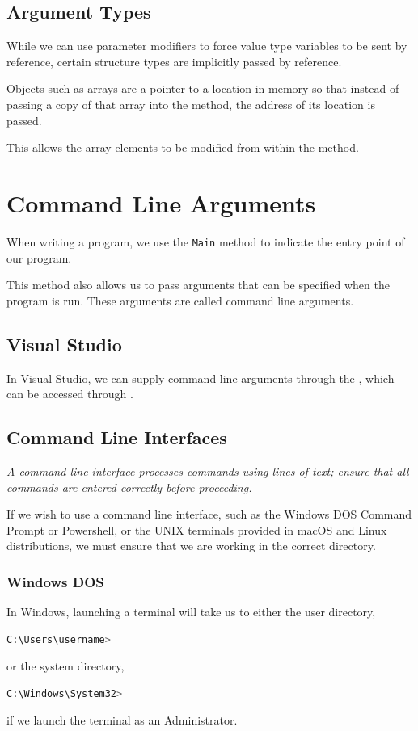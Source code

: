 \documentclass{article}
\begin{document}
\subsection{Argument Types}
While we can use parameter modifiers to force value type variables to be
sent by reference, certain structure types are implicitly passed by reference.

Objects such as arrays are a pointer to a location in memory so that
instead of passing a copy of that array into the method,
the address of its location is passed.

This allows the array elements to be modified from within
the method.
\section{Command Line Arguments}
When writing a program, we use the \lstinline{Main}
method to indicate the entry point of our program.

This method also allows us to pass arguments that can be
specified when the program is run. These arguments are called
command line arguments.
\subsection{Visual Studio}
In Visual Studio, we can supply command line arguments
through the , which can be accessed through
.
\subsection{Command Line Interfaces}
\emph{A command line interface processes commands using lines of text;
    ensure that all commands are entered correctly before proceeding.}

\vspace*{0.3cm}
If we wish to use a command line interface, such as the Windows DOS Command Prompt
or Powershell, or the UNIX terminals provided in macOS and Linux distributions,
we must ensure that we are working in the correct directory.
\subsubsection{Windows DOS}
In Windows, launching a terminal will take us to either the user directory,
\begin{lstlisting}[language=bash,numbers=none]
C:\Users\username>
\end{lstlisting}
or the system directory,
\begin{lstlisting}[language=bash, numbers=none]
C:\Windows\System32>
\end{lstlisting}
if we launch the terminal as an Administrator.
\end{document}
